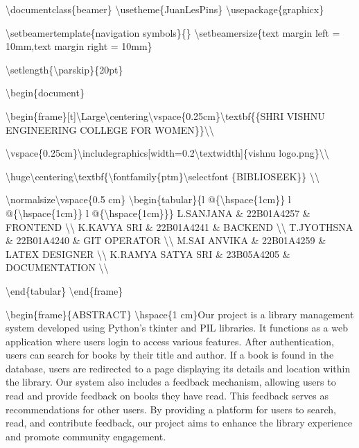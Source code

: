 \textbackslash documentclass\{beamer\}
\textbackslash usetheme\{JuanLesPins\}
\textbackslash usepackage\{graphicx\}

\textbackslash setbeamertemplate\{navigation symbols\}\{\}
\textbackslash setbeamersize\{text margin left = 10mm,text margin right
= 10mm\}

\textbackslash setlength\{\textbackslash parskip\}\{20pt\}

\textbackslash begin\{document\}

\textbackslash begin\{frame\}{[}t{]}\textbackslash Large\textbackslash centering\textbackslash vspace\{0.25cm\}\textbackslash textbf\{\{SHRI
VISHNU ENGINEERING COLLEGE FOR WOMEN\}\}\textbackslash\textbackslash{}

\textbackslash vspace\{0.25cm\}\textbackslash includegraphics{[}width=0.2\textbackslash textwidth{]}\{vishnu
logo.png\}\textbackslash\textbackslash{}

\textbackslash huge\textbackslash centering\textbackslash textbf\{\textbackslash fontfamily\{ptm\}\textbackslash selectfont
\{BIBLIOSEEK\}\} \textbackslash\textbackslash{}

\textbackslash normalsize\textbackslash vspace\{0.5 cm\}
\textbackslash begin\{tabular\}\{l @\{\textbackslash hspace\{1cm\}\} l
@\{\textbackslash hspace\{1cm\}\} l @\{\textbackslash hspace\{1cm\}\}\}
L.SANJANA \& 22B01A4257 \& FRONTEND \textbackslash\textbackslash{}
K.KAVYA SRI \& 22B01A4241 \& BACKEND \textbackslash\textbackslash{}
T.JYOTHSNA \& 22B01A4240 \& GIT OPERATOR \textbackslash\textbackslash{}
M.SAI ANVIKA \& 22B01A4259 \& LATEX DESIGNER
\textbackslash\textbackslash{} K.RAMYA SATYA SRI \& 23B05A4205 \&
DOCUMENTATION \textbackslash\textbackslash{}

\textbackslash end\{tabular\} \textbackslash end\{frame\}

\textbackslash begin\{frame\}\{ABSTRACT\} \textbackslash hspace\{1
cm\}Our project is a library management system developed using Python's
tkinter and PIL libraries. It functions as a web application where users
login to access various features. After authentication, users can search
for books by their title and author. If a book is found in the database,
users are redirected to a page displaying its details and location
within the library. Our system also includes a feedback mechanism,
allowing users to read and provide feedback on books they have read.
This feedback serves as recommendations for other users. By providing a
platform for users to search, read, and contribute feedback, our project
aims to enhance the library experience and promote community engagement.

